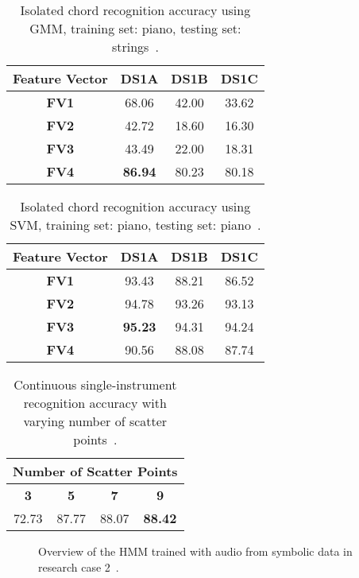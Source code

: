 \documentclass{sig-alternate}
\begin{document}
\begin{table}[h]
\centering
\begin{tabular}{|c|c|c|c|} \hline
\textbf{Feature Vector} & \textbf{DS1A} & \textbf{DS1B} & \textbf{DS1C} \\ \hline
\textbf{FV1} & 68.06 & 42.00 & 33.62 \\ \hline
\textbf{FV2} & 42.72 & 18.60 & 16.30 \\ \hline
\textbf{FV3} & 43.49 & 22.00 & 18.31 \\ \hline
\textbf{FV4} & \textbf{86.94} & 80.23 & 80.18 \\ \hline
\end{tabular}
\caption{Isolated chord recognition accuracy using GMM, training set: piano, testing set: strings~\cite{Morman:2006}.}
\label{tab:tab4}
\end{table}

\begin{table}[h]
\centering
\begin{tabular}{|c|c|c|c|} \hline
\textbf{Feature Vector} & \textbf{DS1A} & \textbf{DS1B} & \textbf{DS1C} \\ \hline
\textbf{FV1} & 93.43 & 88.21 & 86.52 \\ \hline
\textbf{FV2} & 94.78 & 93.26 & 93.13 \\ \hline
\textbf{FV3} & \textbf{95.23} & 94.31 & 94.24 \\ \hline
\textbf{FV4} & 90.56 & 88.08 & 87.74 \\ \hline
\end{tabular}
\caption{Isolated chord recognition accuracy using SVM, training set: piano, testing set: piano~\cite{Morman:2006}.}
\label{tab:tab7}
\end{table}

\begin{table}[h]
\centering
\begin{tabular}{|c|c|c|c|} \hline
\multicolumn{4}{|c|}{\textbf{Number of Scatter Points}} \\ \hline
\textbf{3} & \textbf{5} & \textbf{7} & \textbf{9} \\ \hline
72.73 & 87.77 & 88.07 & \textbf{88.42} \\ \hline
\end{tabular}
\caption{Continuous single-instrument recognition accuracy with varying number of scatter points~\cite{Morman:2006}.}
\label{tab:tab8}
\end{table}

\begin{figure}[h]
\centering
{}
\caption{Overview of the HMM trained with audio from symbolic data in research case 2~\cite{Lee:2006}.}
\label{fig:fig1}
\end{figure}
\end{document}
